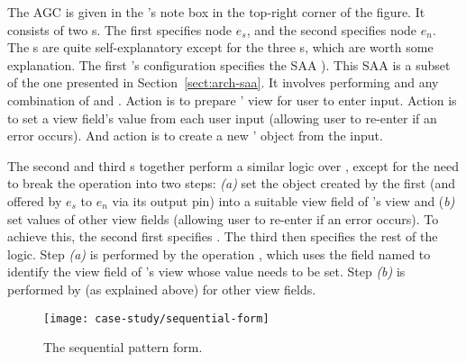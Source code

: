 The AGC is given in the 's note box in the top-right corner of the figure. It consists of two s. The first  specifies node $ e_s $, and the second specifies node $ e_n $. The s are quite self-explanatory except for the three s, which are worth some explanation. The first 's configuration specifies the SAA ). This SAA is a subset of the one presented in Section~\ref{sect:arch-saa}. It involves performing  and any combination of  and . Action  is to prepare ' view for user to enter input. Action  is to set a view field's value from each user input (allowing user to re-enter if an error occurs). And action  is to create a new ' object from the input.

The second and third s together perform a similar logic over , except for the need to break the  operation into two steps: \textit{(a)} set the  object created by the first  (and offered by $ e_s $ to $ e_n $ via its output pin) into a suitable view field of 's view and (\textit{b)} set values of other view fields (allowing user to re-enter if an error occurs). To achieve this, the second  first specifies . The third  then specifies the rest of the logic. Step \textit{(a)} is performed by the operation , which uses the field named  to identify the view field of 's view whose value needs to be set. Step \textit{(b)} is performed by  (as explained above) for other view fields.

\begin{figure*}[]
	\begin{center}
		\texttt{[image: case-study/sequential-form]}
	\end{center}
	\vspace{-0.4cm}
	\caption{The sequential pattern form.} %
	\label{fig:sequential-form}
		\vspace{-0.4cm}
\end{figure*}

%

